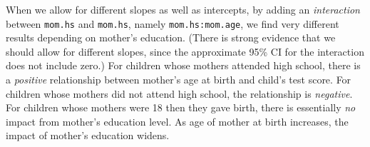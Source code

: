 \documentclass[addpoints,12pt]{exam}\usepackage[]{graphicx}\usepackage[]{color}
\makeatletter
\newenvironment{kframe}{%
 \def\at@end@of@kframe{}%
 \ifinner\ifhmode%
  \def\at@end@of@kframe{\end{minipage}}%
  \begin{minipage}{\columnwidth}%
 \fi\fi%
 \def\FrameCommand##1{\hskip\@totalleftmargin \hskip-\fboxsep
 \colorbox{shadecolor}{##1}\hskip-\fboxsep
     \hskip-\linewidth \hskip-\@totalleftmargin \hskip\columnwidth}%
 \MakeFramed {\advance\hsize-\width
   \@totalleftmargin\z@ \linewidth\hsize
   \@setminipage}}%
 {\par\unskip\endMakeFramed%
 \at@end@of@kframe}
\newenvironment{knitrout}{}{} %
\makeatother
\begin{document}
\begin{questions}
\begin{parts}
\begin{solution}
\begin{knitrout}
\begin{kframe}
\end{kframe}
\end{knitrout}
When we allow for different slopes as well as intercepts, by adding an \emph{interaction} between \texttt{mom.hs} and \texttt{mom.hs}, namely \texttt{mom.hs:mom.age}, we find very different results depending on mother's education. (There is strong evidence that we should allow for different slopes, since the approximate 95\% CI for the interaction does not include zero.)  For children whose mothers attended high school, there is a \emph{positive} relationship between mother's age at birth and child's test score. For children whose mothers did not attend high school, the relationship is \emph{negative}. For children whose mothers were 18 then they gave birth, there is essentially \emph{no} impact from mother's education level. As age of mother at birth increases, the impact of mother's education widens. 
\end{solution}

\end{parts}
\end{questions}
\end{document}
